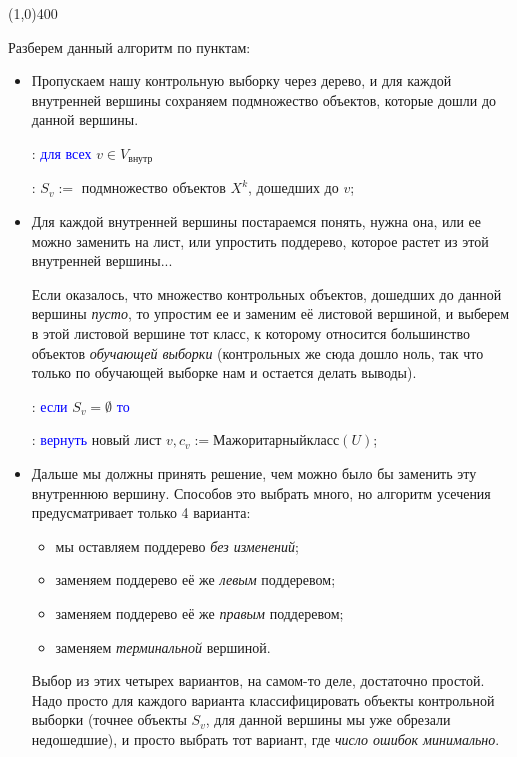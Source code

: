 \documentclass{article}
\begin{document}
\begin{center}
\line(1,0){400}
\end{center}

Разберем данный алгоритм по пунктам:

\begin{itemize}
\item Пропускаем нашу контрольную выборку через дерево, и для каждой внутренней вершины сохраняем подмножество объектов, которые дошли до данной вершины.

\qquad {}: \textcolor{blue}{для всех} $v \in V_\text{внутр}$

\qquad {}: \qquad $S_v :=$ подмножество объектов $X^k$, дошедших до $v$;

\item Для каждой внутренней вершины постараемся понять, нужна она, или ее можно заменить на лист, или упростить поддерево, которое растет из этой внутренней вершины...

Если оказалось, что множество контрольных объектов, дошедших до данной вершины \textit{пусто}, то упростим ее и заменим её листовой вершиной, и выберем в этой листовой вершине тот класс, к которому относится большинство объектов \textit{обучающей выборки} (контрольных же сюда дошло ноль, так что только по обучающей выборке нам и остается делать выводы).

\qquad {}: \qquad \textcolor{blue}{если} $S_v = \emptyset$ \textcolor{blue}{то}

\qquad {}: \qquad \qquad \textcolor{blue}{вернуть}
				новый лист $v, c_v := Мажоритарный класс(U)$;
			
\item Дальше мы должны принять решение, чем можно было бы заменить эту внутреннюю вершину. Способов это выбрать много, но алгоритм усечения предусматривает только 4 варианта:

	\begin{itemize}
	\item мы оставляем поддерево \textit{без изменений};
	\item заменяем поддерево её же \textit{левым} поддеревом;
	\item заменяем поддерево её же \textit{правым} поддеревом;
	\item заменяем \textit{терминальной} вершиной.
	\end{itemize}

	Выбор из этих четырех вариантов, на самом-то деле, достаточно простой. Надо просто для каждого варианта классифицировать объекты контрольной выборки (точнее объекты $S_v$, для данной вершины мы уже обрезали недошедшие), и просто выбрать тот вариант, где \textit{число ошибок минимально}.


\end{itemize}
\end{document}
